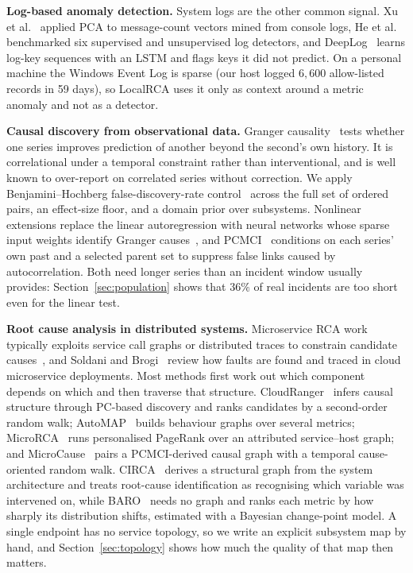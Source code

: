 \documentclass[conference]{IEEEtran}
\begin{document}
\textbf{Log-based anomaly detection.} System logs are the other common
signal. Xu et al.~\cite{xu2009console} applied PCA to message-count vectors
mined from console logs, He et al.~\cite{he2016experience} benchmarked six
supervised and unsupervised log detectors, and DeepLog~\cite{du2017deeplog}
learns log-key sequences with an LSTM and flags keys it did not predict. On a
personal machine the Windows Event Log is sparse (our host logged
$6{,}600$ allow-listed records in 59 days), so LocalRCA uses it only as
context around a metric anomaly and not as a detector.

\textbf{Causal discovery from observational data.} Granger
causality~\cite{granger1969investigating} tests whether one series improves
prediction of another beyond the second's own history. It is correlational
under a temporal constraint rather than interventional, and is well known to
over-report on correlated series without correction. We apply
Benjamini--Hochberg false-discovery-rate control~\cite{benjamini1995controlling}
across the full set of ordered pairs, an effect-size floor, and a domain prior
over subsystems. Nonlinear extensions replace the linear autoregression with
neural networks whose sparse input weights identify Granger
causes~\cite{tank2022neural}, and PCMCI~\cite{runge2019pcmci} conditions on
each series' own past and a selected parent set to suppress false links caused
by autocorrelation. Both need longer series than an incident window usually
provides: Section~\ref{sec:population} shows that $36\%$ of real incidents are
too short even for the linear test.

\textbf{Root cause analysis in distributed systems.} Microservice RCA work
typically exploits service call graphs or distributed traces to constrain
candidate causes~\cite{kim2013root, chen2014causeinfer}, and Soldani and
Brogi~\cite{soldani2022survey} review how faults are found and traced in
cloud microservice deployments. Most methods first work out which component
depends on which and then traverse that structure.
CloudRanger~\cite{wang2018cloudranger} infers causal structure through
PC-based discovery and ranks candidates by a second-order random walk; AutoMAP~\cite{ma2020automap} builds behaviour graphs over several
metrics; MicroRCA~\cite{wu2020microrca} runs personalised PageRank over an
attributed service--host graph; and MicroCause~\cite{meng2020microcause} pairs
a PCMCI-derived causal graph with a temporal cause-oriented random walk.
CIRCA~\cite{li2022circa} derives a structural graph from the system
architecture and treats root-cause identification as recognising which
variable was intervened on, while BARO~\cite{pham2024baro} needs no graph and
ranks each metric by how sharply its distribution shifts, estimated with a
Bayesian change-point model. A
single endpoint has no service topology, so we write an explicit subsystem map
by hand, and Section~\ref{sec:topology} shows how much the quality of that map
then matters.
\end{document}
